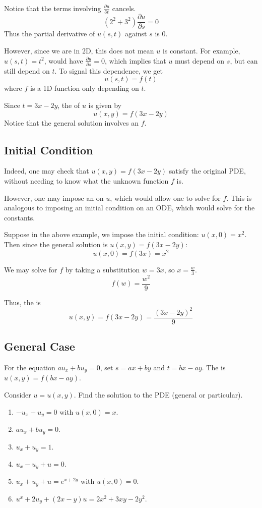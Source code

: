 \documentclass[11pt,fleqn]{book} %
\begin{document}
Notice that the terms involving $\frac{\partial u}{\partial t}$ cancels. $$(2^2 + 3^2) \frac{\partial u}{\partial s} = 0$$ Thus the partial derivative of $u(s, t)$ against $s$ is $0$. 

However, since we are in 2D, this does not mean $u$ is constant. For example, $u(s, t) = t^2$, would have $\frac{\partial u}{\partial s} = 0$, which implies that $u$ must  depend on $s$, but can still depend on $t$. To signal this dependence, we get $$u(s, t) = f(t)$$ where $f$ is a 1D function only depending on $t$. 

Since $t = 3x - 2y$, the  of $u$ is given by $$u(x, y) = f(3x - 2y)$$ Notice that the general solution involves an  $f$.

\subsection*{Initial Condition}

Indeed, one may check that $u(x, y) = f (3x - 2y)$ satisfy the original PDE, without needing to know what the unknown function $f$ is.

However, one may impose an  on $u$, which would allow one to solve for $f$. This is analogous to imposing an initial condition on an ODE, which would solve for the constants.

Suppose in the above example, we impose the initial condition: $u(x, 0) = x^2$. Then since the general solution is $u(x, y) = f(3x - 2y)$: $$u(x,0) = f(3x) = x^2$$

We may solve for $f$ by taking a substitution $w = 3x$, so $x = \frac{w}{3}$. $$f(w) = \frac{w^2}{9}$$ 

Thus, the  is $$u(x,y) = f(3x-2y) = \frac{(3x-2y)^2}{9}$$

\subsection*{General Case}

For the equation $au_x +bu_y = 0$, set $s = ax + by$ and $t = bx - ay$. The  is $u(x, y) = f (bx - ay)$.

\begin{exercise}
    Consider $u = u(x, y)$. Find the solution to the PDE (general or particular). 

    \begin{enumerate}
        \item $-u_x + u_y = 0$ with $u(x, 0) = x$.
        \item $au_x + bu_y = 0$.
        \item $u_x + u_y = 1$.
        \item $u_x - u_y + u = 0$.
        \item $u_x + u_y + u = e^{x+2y}$ with $u(x, 0) = 0$. 
        \item $u^x + 2u_y +(2x - y)u = 2x^2 +3xy - 2y^2$.
    \end{enumerate}
\end{exercise}
\end{document}
